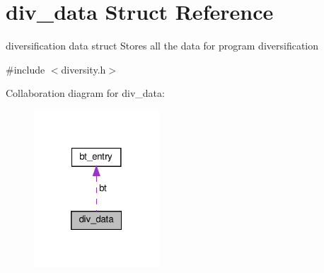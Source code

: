 \hypertarget{structdiv__data}{}\section{div\+\_\+data Struct Reference}
\label{structdiv__data}


diversification data struct Stores all the data for program diversification  




{\ttfamily \#include $<$diversity.\+h$>$}



Collaboration diagram for div\+\_\+data\+:\nopagebreak
\begin{figure}[H]
\begin{center}
\leavevmode
\includegraphics[width=133pt]{structdiv__data__coll__graph}
\end{center}
\end{figure}
